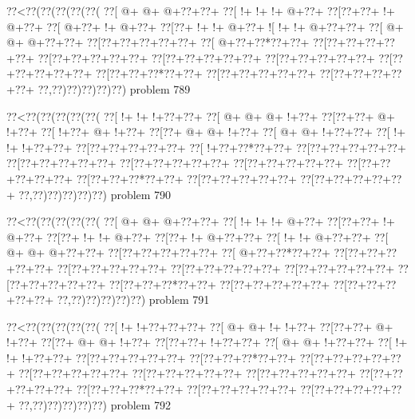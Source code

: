 \vbox{\vbox{\goo
\0??<\0??(\0??(\0??(\0??(\0??(
\0??[\- @+\- @+\- @+\0??+\0??+
\0??[\- !+\- !+\- !+\- @+\0??+
\0??[\0??+\0??+\- !+\- @+\0??+
\0??[\- @+\0??+\- !+\- @+\0??+
\0??[\0??+\- !+\- !+\- @+\0??+
\- ![\- !+\- !+\- @+\0??+\0??+
\0??[\- @+\- @+\- @+\0??+\0??+
\0??[\0??+\0??+\0??+\0??+\0??+
\0??[\- @+\0??+\0??*\0??+\0??+
\0??[\0??+\0??+\0??+\0??+\0??+
\0??[\0??+\0??+\0??+\0??+\0??+
\0??[\0??+\0??+\0??+\0??+\0??+
\0??[\0??+\0??+\0??+\0??+\0??+
\0??[\0??+\0??+\0??+\0??+\0??+
\0??[\0??+\0??+\0??*\0??+\0??+
\0??[\0??+\0??+\0??+\0??+\0??+
\0??[\0??+\0??+\0??+\0??+\0??+
\0??,\0??)\0??)\0??)\0??)\0??)
}
\hfil problem 789\hfil\break
}

\vbox{\vbox{\goo
\0??<\0??(\0??(\0??(\0??(\0??(
\0??[\- !+\- !+\- !+\0??+\0??+
\0??[\- @+\- @+\- @+\- !+\0??+
\0??[\0??+\0??+\- @+\- !+\0??+
\0??[\- !+\0??+\- @+\- !+\0??+
\0??[\0??+\- @+\- @+\- !+\0??+
\0??[\- @+\- @+\- !+\0??+\0??+
\0??[\- !+\- !+\- !+\0??+\0??+
\0??[\0??+\0??+\0??+\0??+\0??+
\0??[\- !+\0??+\0??*\0??+\0??+
\0??[\0??+\0??+\0??+\0??+\0??+
\0??[\0??+\0??+\0??+\0??+\0??+
\0??[\0??+\0??+\0??+\0??+\0??+
\0??[\0??+\0??+\0??+\0??+\0??+
\0??[\0??+\0??+\0??+\0??+\0??+
\0??[\0??+\0??+\0??*\0??+\0??+
\0??[\0??+\0??+\0??+\0??+\0??+
\0??[\0??+\0??+\0??+\0??+\0??+
\0??,\0??)\0??)\0??)\0??)\0??)
}
\hfil problem 790\hfil\break
}

\vbox{\vbox{\goo
\0??<\0??(\0??(\0??(\0??(\0??(
\0??[\- @+\- @+\- @+\0??+\0??+
\0??[\- !+\- !+\- !+\- @+\0??+
\0??[\0??+\0??+\- !+\- @+\0??+
\0??[\0??+\- !+\- !+\- @+\0??+
\0??[\0??+\- !+\- @+\0??+\0??+
\0??[\- !+\- !+\- @+\0??+\0??+
\0??[\- @+\- @+\- @+\0??+\0??+
\0??[\0??+\0??+\0??+\0??+\0??+
\0??[\- @+\0??+\0??*\0??+\0??+
\0??[\0??+\0??+\0??+\0??+\0??+
\0??[\0??+\0??+\0??+\0??+\0??+
\0??[\0??+\0??+\0??+\0??+\0??+
\0??[\0??+\0??+\0??+\0??+\0??+
\0??[\0??+\0??+\0??+\0??+\0??+
\0??[\0??+\0??+\0??*\0??+\0??+
\0??[\0??+\0??+\0??+\0??+\0??+
\0??[\0??+\0??+\0??+\0??+\0??+
\0??,\0??)\0??)\0??)\0??)\0??)
}
\hfil problem 791\hfil\break
}

\vbox{\vbox{\goo
\0??<\0??(\0??(\0??(\0??(\0??(
\0??[\- !+\- !+\0??+\0??+\0??+
\0??[\- @+\- @+\- !+\- !+\0??+
\0??[\0??+\0??+\- @+\- !+\0??+
\0??[\0??+\- @+\- @+\- !+\0??+
\0??[\0??+\0??+\- !+\0??+\0??+
\0??[\- @+\- @+\- !+\0??+\0??+
\0??[\- !+\- !+\- !+\0??+\0??+
\0??[\0??+\0??+\0??+\0??+\0??+
\0??[\0??+\0??+\0??*\0??+\0??+
\0??[\0??+\0??+\0??+\0??+\0??+
\0??[\0??+\0??+\0??+\0??+\0??+
\0??[\0??+\0??+\0??+\0??+\0??+
\0??[\0??+\0??+\0??+\0??+\0??+
\0??[\0??+\0??+\0??+\0??+\0??+
\0??[\0??+\0??+\0??*\0??+\0??+
\0??[\0??+\0??+\0??+\0??+\0??+
\0??[\0??+\0??+\0??+\0??+\0??+
\0??,\0??)\0??)\0??)\0??)\0??)
}
\hfil problem 792\hfil\break
}

